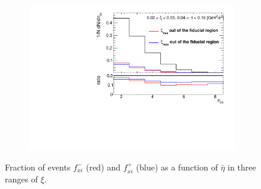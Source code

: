 \begin{figure}[h!]
\begin{subfigure}{.49\textwidth}
	\end{subfigure}
	\begin{subfigure}{.49\textwidth}
		\includegraphics[width=\textwidth,page=9]{chapters/chrgSTAR/img/xiMigration/xi.pdf}
	\end{subfigure}
	\begin{minipage}{.49\textwidth}
		\caption[Fraction of events $f_{xi}^-$ and $f_{xi}^+$ as a function of $\bar{\eta}$ in three ranges of $\xi$]{Fraction of events $f_{xi}^-$ (red) and $f_{xi}^+$ (blue) as a function of $\bar{\eta}$ in three ranges of $\xi$.}
		\label{fig:xi_correction_eta}
	\end{minipage}
	
\end{figure}
\captionsetup{format=default,indention=0pt,justification=justified}
\FloatBarrier